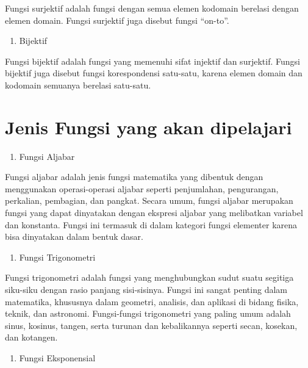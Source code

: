 \documentclass[
]{book}
\providecommand{\tightlist}{%
  \setlength{\itemsep}{0pt}\setlength{\parskip}{0pt}}
\begin{document}
Fungsi surjektif adalah fungsi dengan semua elemen kodomain berelasi dengan elemen domain. Fungsi surjektif juga disebut fungsi ``on-to''.

\begin{enumerate}
\def\labelenumi{\arabic{enumi}.}
\setcounter{enumi}{2}
\tightlist
\item
  Bijektif
\end{enumerate}

Fungsi bijektif adalah fungsi yang memenuhi sifat injektif dan surjektif. Fungsi bijektif juga disebut fungsi korespondensi satu-satu, karena elemen domain dan kodomain semuanya berelasi satu-satu.

\section{Jenis Fungsi yang akan dipelajari}\label{jenis-fungsi-yang-akan-dipelajari}

\begin{enumerate}
\def\labelenumi{\arabic{enumi}.}
\tightlist
\item
  Fungsi Aljabar
\end{enumerate}

Fungsi aljabar adalah jenis fungsi matematika yang dibentuk dengan menggunakan operasi-operasi aljabar seperti penjumlahan, pengurangan, perkalian, pembagian, dan pangkat. Secara umum, fungsi aljabar merupakan fungsi yang dapat dinyatakan dengan ekspresi aljabar yang melibatkan variabel dan konstanta. Fungsi ini termasuk di dalam kategori fungsi elementer karena bisa dinyatakan dalam bentuk dasar.

\begin{enumerate}
\def\labelenumi{\arabic{enumi}.}
\setcounter{enumi}{1}
\tightlist
\item
  Fungsi Trigonometri
\end{enumerate}

Fungsi trigonometri adalah fungsi yang menghubungkan sudut suatu segitiga siku-siku dengan rasio panjang sisi-sisinya. Fungsi ini sangat penting dalam matematika, khususnya dalam geometri, analisis, dan aplikasi di bidang fisika, teknik, dan astronomi. Fungsi-fungsi trigonometri yang paling umum adalah sinus, kosinus, tangen, serta turunan dan kebalikannya seperti secan, kosekan, dan kotangen.

\begin{enumerate}
\def\labelenumi{\arabic{enumi}.}
\setcounter{enumi}{2}
\tightlist
\item
  Fungsi Eksponensial
\end{enumerate}
\end{document}
